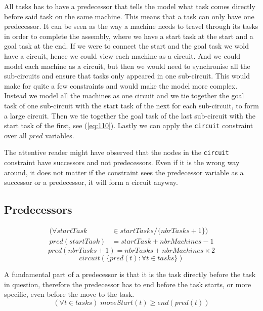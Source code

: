   \noindent All tasks has to have a predecessor that tells the model what task comes directly before said task on the same machine. This means that a task can only have one predecessor. It can be seen as the way a machine needs to travel through its tasks in order to complete the assembly, where we have a start task at the start and a goal task at the end. If we were to connect the start and the goal task we wold have a circuit, hence we could view each machine as a circuit. And we could model each machine as a circuit, but then we would need to synchronise all the sub-circuits and ensure that tasks only appeared in one sub-circuit. This would make for quite a few constraints and would make the model more complex. Instead we model all the machines as one circuit and we tie together the goal task of one sub-circuit with the start task of the next for each sub-circuit, to form a large circuit. Then we tie together the goal task of the last sub-circuit with the start task of the first, see (\ref{eq:110}). Lastly we can apply the \texttt{circuit} constraint over all $pred$ variables.
 
The attentive reader might have observed that the nodes in the \texttt{circuit} constraint have successors and not predecessors. Even if it is the wrong way around, it does not matter if the constraint sees the predecessor variable as a successor or a predecessor, it will form a circuit anyway.
 \subsection{Predecessors}
 \begin{equation}\label{eq:109}
 \begin{aligned}
 (\forall startTask &\in startTasks / \{nbrTasks + 1\}) \\
 pred(startTask) &= startTask + nbrMachines - 1
 \end{aligned}
 \end{equation}
 \begin{equation}\label{eq:110}
 pred(nbrTasks + 1) = nbrTasks + nbrMachines \times 2
 \end{equation}
 \begin{equation}\label{eq:111}
 circuit(\{pred(t) : \forall t \in tasks\})
 \end{equation}

  \noindent A fundamental part of a predecessor is that it is the task directly before the task in question, therefore the predecessor has to end before the task starts, or more specific, even before the move to the task.
 \begin{equation}\label{eq:108}
 (\forall t \in tasks) \; moveStart(t) \geq end(pred(t))
 \end{equation}

